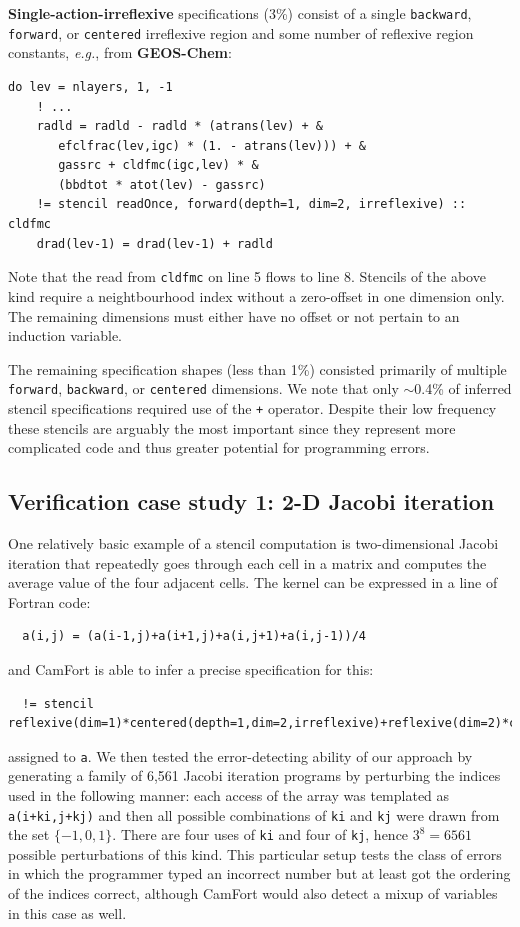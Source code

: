 \documentclass[9pt]{sigplanconf}
\theoremstyle{definition}
\newcommand{\eg}{\emph{e.g.}}
\newcommand{\term}[1]{\texttt{#1}}
\begin{document}
\textbf{Single-action-irreflexive} specifications (3\%) consist of a single
\term{backward}, \term{forward}, or \term{centered} irreflexive region 
and some number of reflexive region constants, \eg{}, from \textbf{GEOS-Chem}:
\begin{verbatim}
do lev = nlayers, 1, -1
    ! ...
    radld = radld - radld * (atrans(lev) + &
       efclfrac(lev,igc) * (1. - atrans(lev))) + &
       gassrc + cldfmc(igc,lev) * &
       (bbdtot * atot(lev) - gassrc)
    != stencil readOnce, forward(depth=1, dim=2, irreflexive) :: cldfmc
    drad(lev-1) = drad(lev-1) + radld
\end{verbatim}
Note that the read from 
\texttt{cldfmc} on line 5 flows to line 8. Stencils of
the above kind require a neightbourhood index without a zero-offset in
one dimension only. The remaining dimensions must either have no
offset or not pertain to an induction variable.

The remaining specification shapes (less than 1\%) consisted
primarily of multiple \term{forward}, \term{backward}, or
\term{centered} dimensions. We note that only $\sim$0.4\% of inferred
stencil specifications required use of the \term{+} operator. Despite their low frequency these stencils are arguably the most important since they represent more complicated code and thus greater potential for programming errors.

\subsection{Verification case study 1: 2-D Jacobi iteration}

One relatively basic example of a stencil computation is two-dimensional
Jacobi iteration that repeatedly goes through each cell in a matrix
and computes the average value of the four adjacent cells. The kernel
can be expressed in a line of Fortran code:
\begin{verbatim}
  a(i,j) = (a(i-1,j)+a(i+1,j)+a(i,j+1)+a(i,j-1))/4
\end{verbatim}
and CamFort is able to infer a precise specification for this:
\begin{verbatim}
  != stencil reflexive(dim=1)*centered(depth=1,dim=2,irreflexive)+reflexive(dim=2)*centered(depth=1,dim=1,irreflexive)
\end{verbatim}
assigned to \term{a}. 
We then tested the error-detecting ability of our approach by 
generating a family of 6,561 Jacobi iteration programs by perturbing
the indices used in the following manner: each access of the array was
templated as \texttt{a(i+ki,j+kj)} and then all possible
combinations of \texttt{ki} and \texttt{kj}
were drawn from the set $\{-1,0,1\}$. There are four uses of
\texttt{ki} and four of \texttt{kj}, hence
$3^8=6561$ possible perturbations of this kind. This particular setup
tests the class of errors in which the programmer typed an incorrect
number but at least got the ordering of the indices correct, although
CamFort would also detect a mixup of variables in this case as well.
\end{document}

